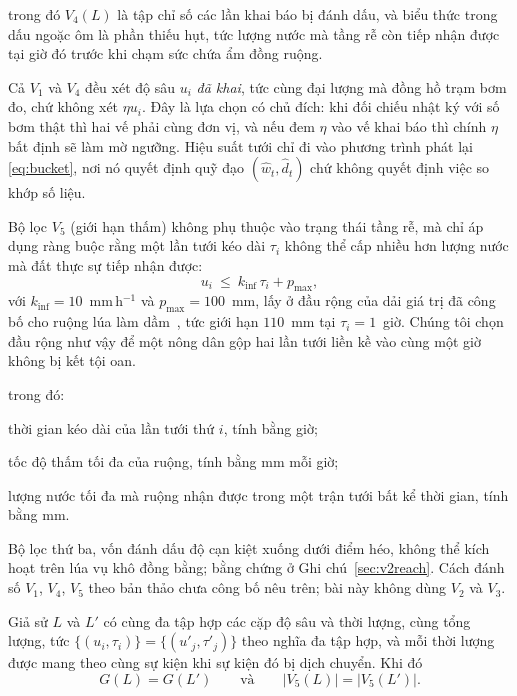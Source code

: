 trong đó $V_4(L)$ là tập chỉ số các lần khai báo bị đánh dấu, và biểu thức trong
dấu ngoặc ôm là phần thiếu hụt, tức lượng nước mà tầng rễ còn tiếp nhận được tại
giờ đó trước khi chạm sức chứa ẩm đồng ruộng.

Cả $V_1$ và $V_4$ đều xét độ sâu $u_i$ \emph{đã khai}, tức cùng đại lượng mà đồng hồ
trạm bơm đo, chứ không xét $\eta u_i$. Đây là lựa chọn có chủ đích: khi đối chiếu
nhật ký với số bơm thật thì hai vế phải cùng đơn vị, và nếu đem $\eta$ vào vế khai
báo thì chính $\eta$ bất định sẽ làm mờ ngưỡng. Hiệu suất tưới chỉ đi vào phương
trình phát lại \eqref{eq:bucket}, nơi nó quyết định quỹ đạo $(\hat w_t,\hat d_t)$
chứ không quyết định việc so khớp số liệu.

Bộ lọc \emph{$V_5$} (giới hạn thấm) không phụ thuộc vào trạng thái tầng rễ, mà
chỉ áp dụng ràng buộc rằng một lần tưới kéo dài $\tau_i$ không thể cấp nhiều hơn
lượng nước mà đất thực sự tiếp nhận được:
\begin{equation}
u_i\ \le\ k_{\mathrm{inf}}\,\tau_i+p_{\max},
\label{eq:v5}
\end{equation}
với $k_{\mathrm{inf}}=10$~mm\,h$^{-1}$ và $p_{\max}=100$~mm, lấy ở đầu rộng của dải giá
trị đã công bố cho ruộng lúa làm dầm~\cite{kukal2004,bouman2001}, tức giới hạn
$110$~mm tại $\tau_i=1$~giờ. Chúng tôi chọn đầu rộng như vậy để một nông dân gộp
hai lần tưới liền kề vào cùng một giờ không bị kết tội oan.


trong đó:
\begin{symbolist}
\item[$\tau_i$] thời gian kéo dài của lần tưới thứ $i$, tính bằng giờ;
\item[$k_{\mathrm{inf}}$] tốc độ thấm tối đa của ruộng, tính bằng mm mỗi giờ;
\item[$p_{\max}$] lượng nước tối đa mà ruộng nhận được trong một trận tưới bất
    kể thời gian, tính bằng mm.
\end{symbolist}

Bộ lọc thứ ba, vốn đánh dấu độ cạn kiệt xuống dưới điểm héo, không thể kích hoạt
trên lúa vụ khô đồng bằng; bằng chứng ở Ghi chú~\ref{sec:v2reach}. Cách đánh số $V_1$, $V_4$, $V_5$ theo bản thảo chưa công bố nêu trên; bài này không dùng $V_2$ và $V_3$.

\begin{proposition}
\label{prop:blind}
Giả sử $L$ và $L'$ có cùng đa tập hợp các cặp độ sâu và thời lượng, cùng tổng
lượng, tức $\{(u_i,\tau_i)\}=\{(u'_j,\tau'_j)\}$ theo nghĩa đa tập hợp, và mỗi
thời lượng được mang theo cùng sự kiện khi sự kiện đó bị dịch chuyển. Khi đó
\begin{equation}
G(L)=G(L')\qquad\text{và}\qquad |V_5(L)|=|V_5(L')|.
\end{equation}
\end{proposition}

